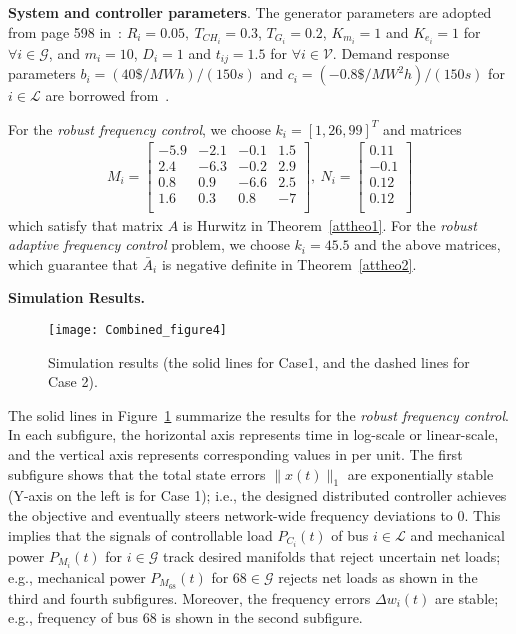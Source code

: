 \documentclass[journal]{IEEEtran}
\newcommand{\GG}{{\mathcal{G}}}
\newcommand{\LL}{{\mathcal{L}}}
\newcommand{\VV}{{\mathcal{V}}}
\begin{document}
\textbf{System and controller parameters}. The generator parameters are adopted from page 598 in~\cite{Kundar.Balu.Lauby:94}:
$R_i = 0.05, \
T_{CH_i} = 0.3$, $T_{G_i} = 0.2$, $K_{m_i}=1$ and $K_{e_i}=1$ for $\forall i \in {\GG}$, and $m_i = 10$, $D_i = 1$ and $t_{ij} = 1.5 $ for $\forall i \in {\VV}$.
Demand response parameters $b_i=(40 \$/MWh)/(150s)$ and $c_i=(-0.8 \$/MW^2h)/(150s)$ for $i \in \LL$ are borrowed from~\cite{Alvarado.Meng.ea:01}. 

For the \emph{robust frequency control},
we choose $k_i=[1,26,99]^T$ and matrices
\begin{align*}
M_{i}=
\left[
\begin{array}{cccc}
-5.9&-2.1&-0.1&1.5\\
2.4&-6.3&-0.2&2.9\\
0.8&0.9&-6.6&2.5\\
1.6&0.3&0.8&-7\\
\end{array}
\right], \ 
N_{i}=
\left[
\begin{array}{c}
0.11\\
-0.1\\
0.12\\
0.12\\
\end{array}
\right]
\end{align*}
which satisfy that matrix $A$ is Hurwitz in Theorem~\ref{attheo1}.
For the \emph{robust adaptive frequency control} problem,
we choose $k_i=45.5$ and the above matrices, which guarantee that $\bar{A}_i$ is negative definite in Theorem~\ref{attheo2}.

\textbf{Simulation Results.}
\begin{figure}[t]   \centering   \texttt{[image: Combined\_figure4]}   \caption{
Simulation results (the solid lines for Case1, and the dashed lines for Case 2).}
\label{Combined_figure} \end{figure}
The solid lines in Figure~\ref{Combined_figure} summarize the results for the \emph{robust frequency control}.
In each subfigure, the horizontal axis represents time in log-scale or linear-scale, and the vertical axis represents corresponding values in per unit.
The first subfigure shows that the total state errors $\|\hat{x}(t)\|_1$ are exponentially stable (Y-axis on the left is for Case 1); i.e., the designed distributed controller achieves the objective and eventually steers network-wide frequency deviations to $0$. 
This implies that the signals of controllable load $P_{C_i}(t)$ of bus $i \in \LL$ and mechanical power $P_{M_{i}}(t)$ for $i \in {\GG}$ track desired manifolds that reject uncertain net loads; e.g., mechanical power $P_{M_{68}}(t)$ for $68 \in {\GG}$ rejects net loads as shown in the third and fourth subfigures.
Moreover, the frequency errors $\Delta w_{i}(t)$ are stable; e.g., frequency of bus $68$ is shown in the second subfigure.
\end{document}
